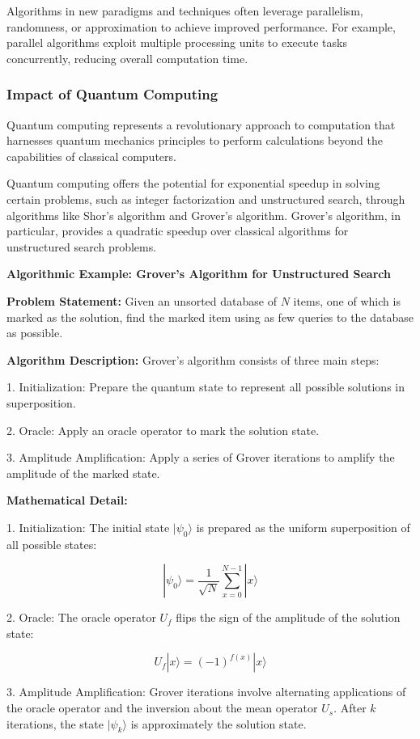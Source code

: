 \documentclass[12pt]{book} %
\begin{document}
Algorithms in new paradigms and techniques often leverage parallelism, randomness, or approximation to achieve improved performance. For example, parallel algorithms exploit multiple processing units to execute tasks concurrently, reducing overall computation time.

\subsubsection{Impact of Quantum Computing}
Quantum computing represents a revolutionary approach to computation that harnesses quantum mechanics principles to perform calculations beyond the capabilities of classical computers.

Quantum computing offers the potential for exponential speedup in solving certain problems, such as integer factorization and unstructured search, through algorithms like Shor's algorithm and Grover's algorithm. Grover's algorithm, in particular, provides a quadratic speedup over classical algorithms for unstructured search problems.

\textbf{Algorithmic Example: Grover's Algorithm for Unstructured Search}

\textbf{Problem Statement:} Given an unsorted database of \(N\) items, one of which is marked as the solution, find the marked item using as few queries to the database as possible.

\textbf{Algorithm Description:} Grover's algorithm consists of three main steps:

1. Initialization: Prepare the quantum state to represent all possible solutions in superposition.

2. Oracle: Apply an oracle operator to mark the solution state.

3. Amplitude Amplification: Apply a series of Grover iterations to amplify the amplitude of the marked state.

\textbf{Mathematical Detail:}

1. Initialization: The initial state \(|\psi_0\rangle\) is prepared as the uniform superposition of all possible states:

\[
|\psi_0\rangle = \frac{1}{\sqrt{N}} \sum_{x=0}^{N-1} |x\rangle
\]

2. Oracle: The oracle operator \(U_f\) flips the sign of the amplitude of the solution state:

\[
U_f|x\rangle = (-1)^{f(x)}|x\rangle
\]

3. Amplitude Amplification: Grover iterations involve alternating applications of the oracle operator and the inversion about the mean operator \(U_s\). After \(k\) iterations, the state \(|\psi_k\rangle\) is approximately the solution state.
\end{document}
